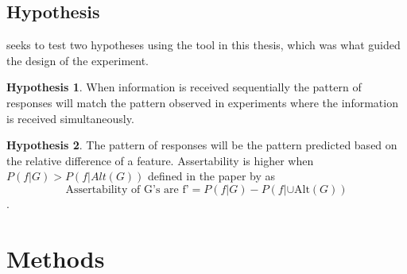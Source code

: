 \documentclass[twoside]{uva-inf-bachelor-thesis}
\theoremstyle{definition}
\newtheorem{hypothesis}{Hypothesis}
\begin{document}
\section{Hypothesis}
\cite{RooijSchulzGenAlt} seeks to test two hypotheses using the tool in this thesis, which was what guided the design of the experiment. 
\begin{hypothesis}
When information is received sequentially the pattern of responses will match the pattern observed in experiments where the information is received simultaneously.
\end{hypothesis}
\begin{hypothesis}
The pattern of responses will be the pattern predicted based on the relative difference of a feature. Assertability is higher when $P(f|G) > P(f|Alt(G))$ defined in the paper by \cite{RooijSchulzGenAlt} as $$\textrm{Assertability of G's are f'} = P(f|G) - P(f|\cup \textrm{Alt}(G))$$.
\end{hypothesis}

\chapter{Methods}
\end{document}
